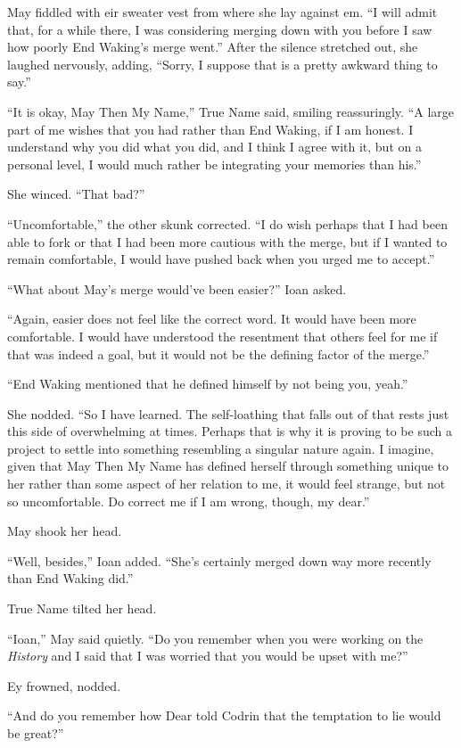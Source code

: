 May fiddled with eir sweater vest from where she lay against em. ``I will admit that, for a while there, I was considering merging down with you before I saw how poorly End Waking's merge went.'' After the silence stretched out, she laughed nervously, adding, ``Sorry, I suppose that is a pretty awkward thing to say.''

``It is okay, May Then My Name,'' True Name said, smiling reassuringly. ``A large part of me wishes that you had rather than End Waking, if I am honest. I understand why you did what you did, and I think I agree with it, but on a personal level, I would much rather be integrating your memories than his.''

She winced. ``That bad?''

``Uncomfortable,'' the other skunk corrected. ``I do wish perhaps that I had been able to fork or that I had been more cautious with the merge, but if I wanted to remain comfortable, I would have pushed back when you urged me to accept.''

``What about May's merge would've been easier?'' Ioan asked.

``Again, easier does not feel like the correct word. It would have been more comfortable. I would have understood the resentment that others feel for me if that was indeed a goal, but it would not be the defining factor of the merge.''

``End Waking mentioned that he defined himself by not being you, yeah.''

She nodded. ``So I have learned. The self-loathing that falls out of that rests just this side of overwhelming at times. Perhaps that is why it is proving to be such a project to settle into something resembling a singular nature again. I imagine, given that May Then My Name has defined herself through something unique to her rather than some aspect of her relation to me, it would feel strange, but not so uncomfortable. Do correct me if I am wrong, though, my dear.''

May shook her head.

``Well, besides,'' Ioan added. ``She's certainly merged down way more recently than End Waking did.''

True Name tilted her head.

``Ioan,'' May said quietly. ``Do you remember when you were working on the \emph{History} and I said that I was worried that you would be upset with me?''

Ey frowned, nodded.

``And do you remember how Dear told Codrin that the temptation to lie would be great?''

